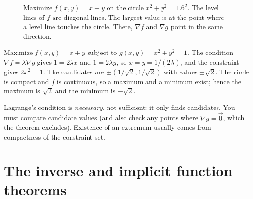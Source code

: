 \begin{figure}[ht]
\centering
{}
\caption{Maximize $f(x,y)=x+y$ on the circle $x^2+y^2=1.6^2$. The level lines of $f$ are diagonal lines. The largest value is at the point where a level line touches the circle. There, $\nabla f$ and $\nabla g$ point in the same direction.}
\label{fig:lagrange}
\end{figure}

\begin{example}
Maximize $f(x,y)=x+y$ subject to $g(x,y)=x^2+y^2=1$. The condition $\nabla f=\lambda\nabla g$ gives $1=2\lambda x$ and $1=2\lambda y$, so $x=y=1/(2\lambda)$, and the constraint gives $2x^2=1$. The candidates are $\pm(1/\sqrt2,1/\sqrt2)$ with values $\pm\sqrt2$. The circle is compact and $f$ is continuous, so a maximum and a minimum exist; hence the maximum is $\sqrt2$ and the minimum is $-\sqrt2$.
\end{example}

\begin{pitfall}
Lagrange's condition is \emph{necessary}, not sufficient: it only finds candidates. You must compare candidate values (and also check any points where $\nabla g=\vec 0$, which the theorem excludes). Existence of an extremum usually comes from compactness of the constraint set.
\end{pitfall}

\section{The inverse and implicit function theorems}

